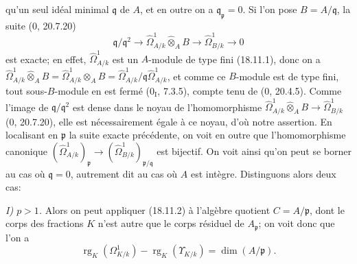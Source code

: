 
qu'un seul idéal minimal $\mathfrak q$ de $A$, et en outre on a $\mathfrak q_{\mathfrak p}=0$. Si l'on pose $B=A/\mathfrak q$, la suite (0, 20.7.20)
\[
  \mathfrak q/\mathfrak q^2\longrightarrow
  \hat{\Omega}^1_{A/k}\widehat{\otimes}_A B
  \longrightarrow\hat{\Omega}^1_{B/k}\longrightarrow0
\]
est exacte; en effet, $\hat{\Omega}^1_{A/k}$ est un $A$-module de type fini (18.11.1), donc on a $\hat{\Omega}^1_{A/k}\widehat{\otimes}_A B=\hat{\Omega}^1_{A/k}\otimes_A B=\hat{\Omega}^1_{A/k}/\mathfrak q\hat{\Omega}^1_{A/k}$, et comme ce $B$-module est de type fini, tout sous-$B$-module en est fermé ($0_{\mathrm I}$, 7.3.5), compte tenu de (0, 20.4.5). Comme l'image de $\mathfrak q/\mathfrak q^2$ est dense dans le noyau de l'homomorphisme $\hat{\Omega}^1_{A/k}\widehat{\otimes}_A B\to\hat{\Omega}^1_{B/k}$ (0, 20.7.20), elle est nécessairement égale à ce noyau, d'où notre assertion. En localisant en $\mathfrak p$ la suite exacte précédente, on voit en outre que l'homomorphisme canonique $(\hat{\Omega}^1_{A/k})_{\mathfrak p}\to(\hat{\Omega}^1_{B/k})_{\mathfrak p/\mathfrak q}$ est bijectif. On voit ainsi qu'on peut se borner au cas où $\mathfrak q=0$, autrement dit au cas où $A$ est intègre. Distinguons alors deux cas:

\emph{I) $p>1$.} Alors on peut appliquer (18.11.2) à l'algèbre quotient $C=A/\mathfrak p$, dont le corps des fractions $K$ n'est autre que le corps résiduel de $A_{\mathfrak p}$; on voit donc que l'on a
\begin{equation}
\label{IV.18.11.3.1}
\tag{18.11.3.1}
  \operatorname{rg}_K(\Omega^1_{K/k})-\operatorname{rg}_K(\Upsilon_{K/k})=\dim(A/\mathfrak p).
\end{equation}

